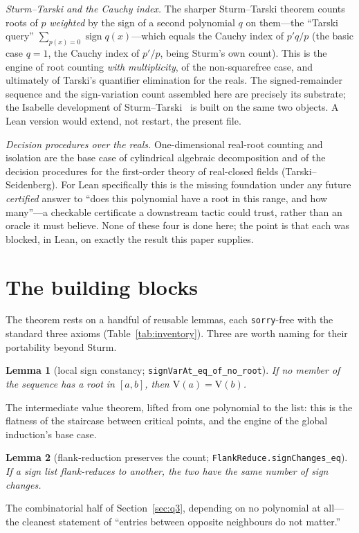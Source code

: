 \documentclass[11pt]{article}
\newtheorem{lemma}{Lemma}
\newcommand{\lean}[1]{\texttt{#1}}
\newcommand{\V}{\mathrm{V}}
\begin{document}
\emph{Sturm--Tarski and the Cauchy index.} The sharper Sturm--Tarski theorem counts roots of $p$
\emph{weighted} by the sign of a second polynomial $q$ on them---the ``Tarski query''
$\sum_{p(x)=0}\operatorname{sign} q(x)$---which equals the Cauchy index of $p'q/p$ (the basic case
$q=1$, the Cauchy index of $p'/p$, being Sturm's own count). This is the engine of root counting
\emph{with multiplicity}, of the non-squarefree case, and ultimately of Tarski's quantifier elimination for
the reals. The signed-remainder sequence and the sign-variation count assembled here are precisely
its substrate; the Isabelle development of Sturm--Tarski~\cite{litarski,libudan} is built on the
same two objects. A Lean version would extend, not restart, the present file.

\emph{Decision procedures over the reals.} One-dimensional real-root counting and isolation are the
base case of cylindrical algebraic decomposition and of the decision procedures for the first-order
theory of real-closed fields (Tarski--Seidenberg). For Lean specifically this is the missing
foundation under any future \emph{certified} answer to ``does this polynomial have a root in this
range, and how many''---a checkable certificate a downstream tactic could trust, rather than an
oracle it must believe. None of these four is done here; the point is that each was blocked, in
Lean, on exactly the result this paper supplies.

\section{The building blocks}\label{sec:blocks}

The theorem rests on a handful of reusable lemmas, each \lean{sorry}-free with the standard three
axioms (Table~\ref{tab:inventory}). Three are worth naming for their portability beyond Sturm.

\begin{lemma}[local sign constancy; \lean{signVarAt\_eq\_of\_no\_root}]
If no member of the sequence has a root in $[a,b]$, then $\V(a)=\V(b)$.
\end{lemma}
The intermediate value theorem, lifted from one polynomial to the list: this is the flatness of the
staircase between critical points, and the engine of the global induction's base case.

\begin{lemma}[flank-reduction preserves the count; \lean{FlankReduce.signChanges\_eq}]
If a sign list flank-reduces to another, the two have the same number of sign changes.
\end{lemma}
The combinatorial half of Section~\ref{sec:q3}, depending on no polynomial at all---the cleanest
statement of ``entries between opposite neighbours do not matter.''
\end{document}
